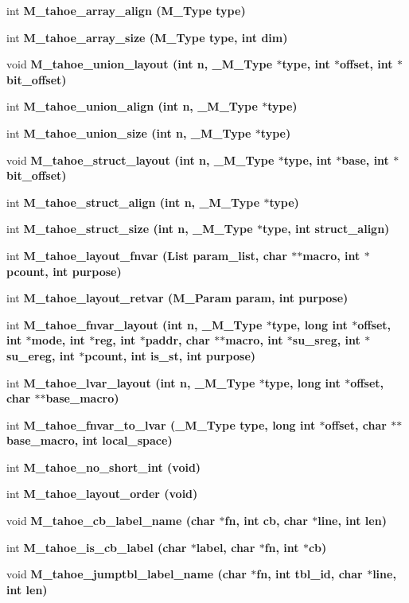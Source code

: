\begin{CompactItemize}
\item 
int \bf{M\_\-tahoe\_\-array\_\-align} (\bf{M\_\-Type} type)
\item 
int \bf{M\_\-tahoe\_\-array\_\-size} (\bf{M\_\-Type} type, int dim)
\item 
void \bf{M\_\-tahoe\_\-union\_\-layout} (int n, \bf{\_\-M\_\-Type} $\ast$type, int $\ast$offset, int $\ast$bit\_\-offset)
\item 
int \bf{M\_\-tahoe\_\-union\_\-align} (int n, \bf{\_\-M\_\-Type} $\ast$type)
\item 
int \bf{M\_\-tahoe\_\-union\_\-size} (int n, \bf{\_\-M\_\-Type} $\ast$type)
\item 
void \bf{M\_\-tahoe\_\-struct\_\-layout} (int n, \bf{\_\-M\_\-Type} $\ast$type, int $\ast$base, int $\ast$bit\_\-offset)
\item 
int \bf{M\_\-tahoe\_\-struct\_\-align} (int n, \bf{\_\-M\_\-Type} $\ast$type)
\item 
int \bf{M\_\-tahoe\_\-struct\_\-size} (int n, \bf{\_\-M\_\-Type} $\ast$type, int struct\_\-align)
\item 
int \bf{M\_\-tahoe\_\-layout\_\-fnvar} (\bf{List} param\_\-list, char $\ast$$\ast$macro, int $\ast$pcount, int purpose)
\item 
int \bf{M\_\-tahoe\_\-layout\_\-retvar} (\bf{M\_\-Param} param, int purpose)
\item 
int \bf{M\_\-tahoe\_\-fnvar\_\-layout} (int n, \bf{\_\-M\_\-Type} $\ast$type, long int $\ast$offset, int $\ast$\bf{mode}, int $\ast$reg, int $\ast$paddr, char $\ast$$\ast$macro, int $\ast$su\_\-sreg, int $\ast$su\_\-ereg, int $\ast$pcount, int is\_\-st, int purpose)
\item 
int \bf{M\_\-tahoe\_\-lvar\_\-layout} (int n, \bf{\_\-M\_\-Type} $\ast$type, long int $\ast$offset, char $\ast$$\ast$base\_\-macro)
\item 
int \bf{M\_\-tahoe\_\-fnvar\_\-to\_\-lvar} (\bf{\_\-M\_\-Type} type, long int $\ast$offset, char $\ast$$\ast$base\_\-macro, int local\_\-space)
\item 
int \bf{M\_\-tahoe\_\-no\_\-short\_\-int} (void)
\item 
int \bf{M\_\-tahoe\_\-layout\_\-order} (void)
\item 
void \bf{M\_\-tahoe\_\-cb\_\-label\_\-name} (char $\ast$fn, int cb, char $\ast$line, int len)
\item 
int \bf{M\_\-tahoe\_\-is\_\-cb\_\-label} (char $\ast$label, char $\ast$fn, int $\ast$cb)
\item 
void \bf{M\_\-tahoe\_\-jumptbl\_\-label\_\-name} (char $\ast$fn, int tbl\_\-id, char $\ast$line, int len)

\end{CompactItemize}
